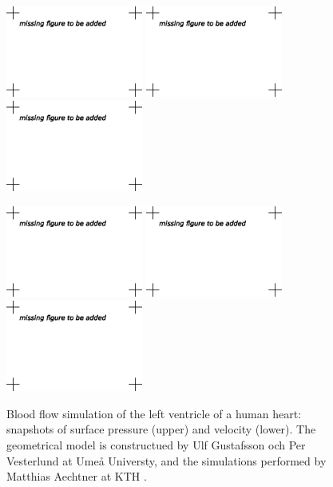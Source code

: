 \begin{figure}[bhpt]

\centerline{
\includegraphics[width=4.5cm]{chapters/hoffman-1/eps/pressure_animation-0020.eps}
\includegraphics[width=4.5cm]{chapters/hoffman-1/eps/pressure_animation-0064.eps}
\includegraphics[width=4.5cm]{chapters/hoffman-1/eps/pressure_animation-0135.eps}
}

\centerline{
\includegraphics[width=4.5cm]{chapters/hoffman-1/eps/velocity_animation-0020.eps}
\includegraphics[width=4.5cm]{chapters/hoffman-1/eps/velocity_animation-0064.eps}
\includegraphics[width=4.5cm]{chapters/hoffman-1/eps/velocity_animation-0135.eps}
}
\caption{Blood flow simulation of the left ventricle of a human heart: snapshots of surface pressure (upper) and velocity (lower).
The geometrical model is constructued by Ulf Gustafsson och Per Vesterlund at Ume{\aa} Universty, and the simulations
performed by Matthias Aechtner at KTH \cite{Aechtner2009}.}
\label{fig:heart}
\end{figure}


